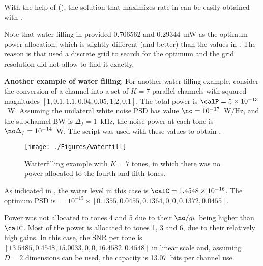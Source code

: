 With the help of  (), the solution that maximizes rate in  can be easily obtained with .


Note that water filling in  provided 0.706562 and 0.29344~mW as the optimum power allocation, which is slightly different (and better) than the values in . The reason is that  used a discrete grid to search for the optimum and the grid resolution did not allow to find it exactly.

\bExample \textbf{Another example of water filling}.
For another water filling example, consider the conversion of a channel into a set of $K=7$ parallel channels with squared magnitudes $[1,0.1, 1.1, 0.04, 0.05, 1.2, 0.1]$. The total power is $\calP=5 \times 10^{-13}$~W.
Assuming the unilateral white noise PSD has value $\no = 10^{-17}$~W/Hz, and the subchannel BW is $\Delta_f = 1$~kHz, the noise power at each tone is $\no \Delta_f = 10^{-14}$~W. 
The script  was used with these values to obtain . 

\begin{figure}
\centering
\texttt{[image: ./Figures/waterfill]}
\caption{Watterfilling example with $K=7$ tones, in which there was no power allocated to the fourth and fifth tones.}\label{fig:waterfill}
\end{figure}

As indicated in , the water level in this case is $\calC=1.4548 \times 10^{-16}$. 
The optimum PSD is $=10^{-15}\times[0.1355    , 0.0455    , 0.1364         , 0        , 0 ,0.1372    ,0.0455]$.

Power was not allocated to tones 4 and 5 due to their $\no/g_k$ being higher than $\calC$. Most of the power is allocated to tones 1, 3 and 6, due to their relatively high gains.
In this case, the SNR per tone is $[13.5485    , 0.4548   , 15.0033         , 0         , 0, 16.4582    , 0.4548]$ in linear scale and, assuming $D=2$ dimensions can be used, the capacity is
13.07~bits per channel use.
\eExample

